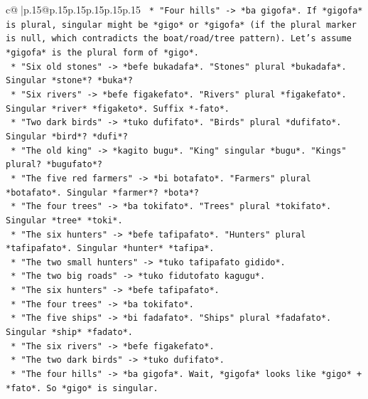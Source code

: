 \documentclass{article}
\begin{document}
{\begin{supertabular}{c@{$\;$}|p{.15\linewidth}@{}p{.15\linewidth}p{.15\linewidth}p{.15\linewidth}p{.15\linewidth}p{.15\linewidth}}
{{{\texttt{        *   "Four hills" {-}> *ba gigofa*. If *gigofa* is plural, singular might be *gigo* or *gigofa* (if the plural marker is null, which contradicts the boat/road/tree pattern). Let's assume *gigofa* is the plural form of *gigo*.} \\
\texttt{        *   "Six old stones" {-}> *befe bukadafa*. "Stones" plural *bukadafa*. Singular *stone*? *buka*?} \\
\texttt{        *   "Six rivers" {-}> *befe figakefato*. "Rivers" plural *figakefato*. Singular *river* *figaketo*. Suffix *{-}fato*.} \\
\texttt{        *   "Two dark birds" {-}> *tuko dufifato*. "Birds" plural *dufifato*. Singular *bird*? *dufi*?} \\
\texttt{        *   "The old king" {-}> *kagito bugu*. "King" singular *bugu*. "Kings" plural? *bugufato*?} \\
\texttt{        *   "The five red farmers" {-}> *bi botafato*. "Farmers" plural *botafato*. Singular *farmer*? *bota*?} \\
\texttt{        *   "The four trees" {-}> *ba tokifato*. "Trees" plural *tokifato*. Singular *tree* *toki*.} \\
\texttt{        *   "The six hunters" {-}> *befe tafipafato*. "Hunters" plural *tafipafato*. Singular *hunter* *tafipa*.} \\
\texttt{        *   "The two small hunters" {-}> *tuko tafipafato gidido*.} \\
\texttt{        *   "The two big roads" {-}> *tuko fidutofato kagugu*.} \\
\texttt{        *   "The six hunters" {-}> *befe tafipafato*.} \\
\texttt{        *   "The four trees" {-}> *ba tokifato*.} \\
\texttt{        *   "The five ships" {-}> *bi fadafato*. "Ships" plural *fadafato*. Singular *ship* *fadato*.} \\
\texttt{        *   "The six rivers" {-}> *befe figakefato*.} \\
\texttt{        *   "The two dark birds" {-}> *tuko dufifato*.} \\
\texttt{        *   "The four hills" {-}> *ba gigofa*. Wait, *gigofa* looks like *gigo* + *fato*. So *gigo* is singular.} \\
}}}
\end{supertabular}}
\end{document}
